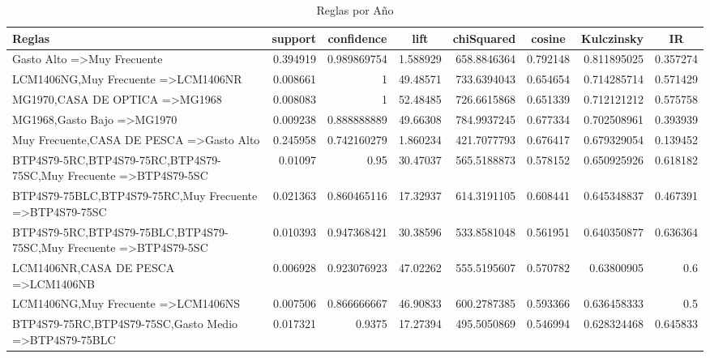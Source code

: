 \documentclass[]{article}
\begin{document}
\begin{landscape}
	\begin{table}[htbp]
		\centering
		\caption{Reglas por Año}
		\begin{tabular}{lrrrrrrr}
			\huge Reglas & \multicolumn{1}{c}{support} & \multicolumn{1}{c}{confidence} & \multicolumn{1}{c}{lift} & \multicolumn{1}{c}{chiSquared} & \multicolumn{1}{c}{cosine} & \multicolumn{1}{c}{Kulczinsky} & \multicolumn{1}{c}{IR} \\
			\hline	
			{Gasto Alto} =\textgreater {Muy Frecuente} & 0.394919 & 0.989869754 & 1.588929 & 658.8846364 & 0.792148 & 0.811895025 & 0.357274 \\
			{LCM1406NG,Muy Frecuente} =\textgreater {LCM1406NR} & 0.008661 & 1     & 49.48571 & 733.6394043 & 0.654654 & 0.714285714 & 0.571429 \\
			{MG1970,CASA DE OPTICA} =\textgreater {MG1968} & 0.008083 & 1     & 52.48485 & 726.6615868 & 0.651339 & 0.712121212 & 0.575758 \\
			{MG1968,Gasto Bajo} =\textgreater {MG1970} & 0.009238 & 0.888888889 & 49.66308 & 784.9937245 & 0.677334 & 0.702508961 & 0.393939 \\
			{Muy Frecuente,CASA DE PESCA} =\textgreater {Gasto Alto} & 0.245958 & 0.742160279 & 1.860234 & 421.7077793 & 0.676417 & 0.679329054 & 0.139452 \\
			{BTP4S79-5RC,BTP4S79-75RC,BTP4S79-75SC,Muy Frecuente} =\textgreater {BTP4S79-5SC} & 0.01097 & 0.95  & 30.47037 & 565.5188873 & 0.578152 & 0.650925926 & 0.618182 \\
			{BTP4S79-75BLC,BTP4S79-75RC,Muy Frecuente} =\textgreater {BTP4S79-75SC} & 0.021363 & 0.860465116 & 17.32937 & 614.3191105 & 0.608441 & 0.645348837 & 0.467391 \\
			{BTP4S79-5RC,BTP4S79-75BLC,BTP4S79-75SC,Muy Frecuente} =\textgreater {BTP4S79-5SC} & 0.010393 & 0.947368421 & 30.38596 & 533.8581048 & 0.561951 & 0.640350877 & 0.636364 \\
			{LCM1406NR,CASA DE PESCA} =\textgreater {LCM1406NB} & 0.006928 & 0.923076923 & 47.02262 & 555.5195607 & 0.570782 & 0.63800905 & 0.6 \\
			{LCM1406NG,Muy Frecuente} =\textgreater {LCM1406NS} & 0.007506 & 0.866666667 & 46.90833 & 600.2787385 & 0.593366 & 0.636458333 & 0.5 \\
			{BTP4S79-75RC,BTP4S79-75SC,Gasto Medio} =\textgreater {BTP4S79-75BLC} & 0.017321 & 0.9375 & 17.27394 & 495.5050869 & 0.546994 & 0.628324468 & 0.645833 \\

\end{tabular}
\end{table}
\end{landscape}
\end{document}
